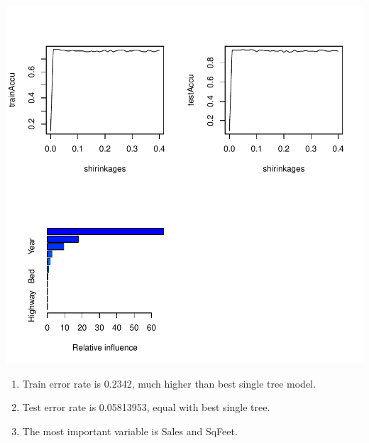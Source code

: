 \documentclass[a4paper]{article}
\begin{document}
\includegraphics{tree-4}

{\color{red}
\begin{enumerate}
\item Train error rate is 0.2342, much higher than best single tree model.
\item Test error rate is 0.05813953, equal with best single tree.
\item The most important variable is Sales and SqFeet.
\end{enumerate}
}
\end{document}
